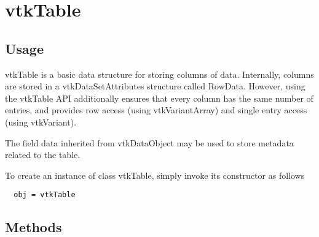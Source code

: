 \section{vtkTable}

\subsection{Usage}

 vtkTable is a basic data structure for storing columns of data.
 Internally, columns are stored in a vtkDataSetAttributes structure called
 RowData. However, using the vtkTable API additionally ensures that every column
 has the same number of entries, and provides row access (using vtkVariantArray)
 and single entry access (using vtkVariant).

 The field data inherited from vtkDataObject may be used to store metadata
 related to the table.


To create an instance of class vtkTable, simply
invoke its constructor as follows
\begin{verbatim}
  obj = vtkTable
\end{verbatim}
\subsection{Methods}


